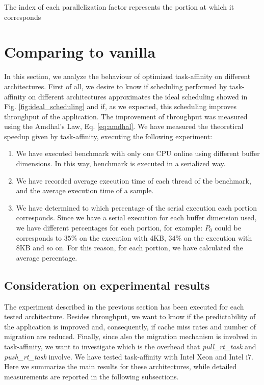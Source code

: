 The index of each parallelization factor represents the portion at which it corresponds

\section{Comparing to vanilla}

In this section, we analyze the behaviour of optimized task-affinity on different architectures. First of all, we desire to know if scheduling performed by 
task-affinity on different architectures approximates the ideal scheduling showed in Fig. \ref{fig:ideal_scheduling} and if, as we expected, this 
scheduling improves throughput of the application. The improvement of throughput was measured using the Amdhal's Law, Eq. \ref{eq:amdhal}. We have measured 
the theoretical speedup given by task-affinity, executing the following experiment:

\begin{enumerate}
\item We have executed benchmark with only one CPU online using different buffer dimensions. In this way, benchmark is executed in a serialized way.
\item We have recorded average execution time of each thread of the benchmark, and the average execution time of a sample.
\item We have determined to which percentage of the serial execution each portion corresponds. Since we have a serial execution for each buffer dimension 
used, we have different percentages for each portion, for example: $P_{0}$ could be corresponds to $35\%$ on the execution with 4KB, $34\%$ on the execution 
with 8KB and so on. For this reason, for each portion, we have calculated the average percentage.
\end{enumerate}

\subsection{Consideration on experimental results}

The experiment described in the previous section has been executed for each tested architecture. Besides throughput, we want to know if the predictability 
of the application is improved and, consequently, if cache miss rates and number of migration are reduced. Finally, since also the migration mechanism is 
involved in task-affinity, we want to investigate which is the overhead that \textit{pull\_rt\_task} and \textit{push\_rt\_task} involve. We have tested 
task-affinity with Intel Xeon and Intel i7. Here we summarize the main results for these architectures, while detailed measurements are reported in the 
following subsections.

